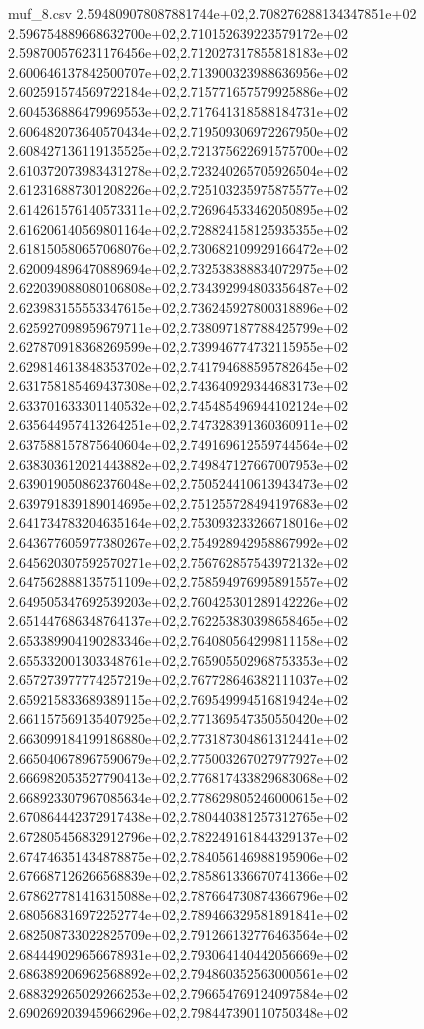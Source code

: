 \begin{filecontents*}{muf_8.csv}
2.594809078087881744e+02,2.708276288134347851e+02
2.596754889668632700e+02,2.710152639223579172e+02
2.598700576231176456e+02,2.712027317855818183e+02
2.600646137842500707e+02,2.713900323988636956e+02
2.602591574569722184e+02,2.715771657579925886e+02
2.604536886479969553e+02,2.717641318588184731e+02
2.606482073640570434e+02,2.719509306972267950e+02
2.608427136119135525e+02,2.721375622691575700e+02
2.610372073983431278e+02,2.723240265705926504e+02
2.612316887301208226e+02,2.725103235975875577e+02
2.614261576140573311e+02,2.726964533462050895e+02
2.616206140569801164e+02,2.728824158125935355e+02
2.618150580657068076e+02,2.730682109929166472e+02
2.620094896470889694e+02,2.732538388834072975e+02
2.622039088080106808e+02,2.734392994803356487e+02
2.623983155553347615e+02,2.736245927800318896e+02
2.625927098959679711e+02,2.738097187788425799e+02
2.627870918368269599e+02,2.739946774732115955e+02
2.629814613848353702e+02,2.741794688595782645e+02
2.631758185469437308e+02,2.743640929344683173e+02
2.633701633301140532e+02,2.745485496944102124e+02
2.635644957413264251e+02,2.747328391360360911e+02
2.637588157875640604e+02,2.749169612559744564e+02
2.638303612021443882e+02,2.749847127667007953e+02
2.639019050862376048e+02,2.750524410613943473e+02
2.639791839189014695e+02,2.751255728494197683e+02
2.641734783204635164e+02,2.753093233266718016e+02
2.643677605977380267e+02,2.754928942958867992e+02
2.645620307592570271e+02,2.756762857543972132e+02
2.647562888135751109e+02,2.758594976995891557e+02
2.649505347692539203e+02,2.760425301289142226e+02
2.651447686348764137e+02,2.762253830398658465e+02
2.653389904190283346e+02,2.764080564299811158e+02
2.655332001303348761e+02,2.765905502968753353e+02
2.657273977774257219e+02,2.767728646382111037e+02
2.659215833689389115e+02,2.769549994516819424e+02
2.661157569135407925e+02,2.771369547350550420e+02
2.663099184199186880e+02,2.773187304861312441e+02
2.665040678967590679e+02,2.775003267027977927e+02
2.666982053527790413e+02,2.776817433829683068e+02
2.668923307967085634e+02,2.778629805246000615e+02
2.670864442372917438e+02,2.780440381257312765e+02
2.672805456832912796e+02,2.782249161844329137e+02
2.674746351434878875e+02,2.784056146988195906e+02
2.676687126266568839e+02,2.785861336670741366e+02
2.678627781416315088e+02,2.787664730874366796e+02
2.680568316972252774e+02,2.789466329581891841e+02
2.682508733022825709e+02,2.791266132776463564e+02
2.684449029656678931e+02,2.793064140442056669e+02
2.686389206962568892e+02,2.794860352563000561e+02
2.688329265029266253e+02,2.796654769124097584e+02
2.690269203945966296e+02,2.798447390110750348e+02

\end{filecontents*}
